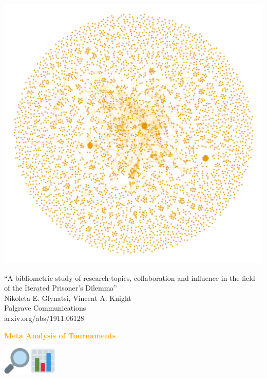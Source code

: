 \documentclass{beamer}
\begin{document}
\begin{frame}
    \begin{center}
        \includegraphics[width=.7\textwidth]{static/pd.png}
    \end{center}
\end{frame}

\begin{frame}
    \begin{center}
        \large{``A bibliometric study of research topics, collaboration and influence in the field of the Iterated Prisoner's Dilemma''} \\ \vspace{.5cm}
        \footnotesize{Nikoleta E. Glynatsi, Vincent A. Knight} \\ \vspace{.5cm}
        \footnotesize{Palgrave Communications} \\ \vspace{.5cm}
        \footnotesize{arxiv.org/abs/1911.06128}
    \end{center}
\end{frame}

\begin{frame}
    \begin{center}
    \textcolor{orange}{\large{\textbf{Meta Analysis of Tournaments}}} \vspace{1cm}

    \includegraphics[width=0.10\textwidth]{static/look.png}\hspace{2pt}\includegraphics[width=0.10\textwidth]{static/bar.png}
    \end{center}
\end{frame}
\end{document}
